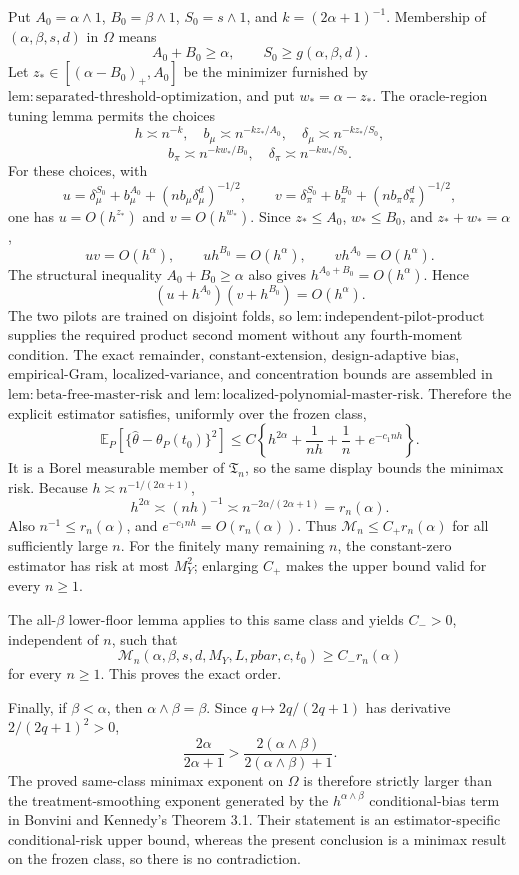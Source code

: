 Put \(A_0=\alpha\wedge1\), \(B_0=\beta\wedge1\), \(S_0=s\wedge1\), and \(k=(2\alpha+1)^{-1}\). Membership of \((\alpha,\beta,s,d)\) in \(\Omega\) means
\[
A_0+B_0\ge\alpha,
\qquad
S_0\ge g(\alpha,\beta,d).
\]
Let \(z_*\in[(\alpha-B_0)_+,A_0]\) be the minimizer furnished by \(\mathrm{lem:separated\text{-}threshold\text{-}optimization}\), and put \(w_*=\alpha-z_*\). The oracle-region tuning lemma permits the choices
\[
h\asymp n^{-k},\quad b_\mu\asymp n^{-kz_*/A_0},\quad \delta_\mu\asymp n^{-kz_*/S_0},
\]
\[
b_\pi\asymp n^{-kw_*/B_0},\quad \delta_\pi\asymp n^{-kw_*/S_0}.
\]
For these choices, with
\[
u=\delta_\mu^{S_0}+b_\mu^{A_0}+(nb_\mu\delta_\mu^d)^{-1/2},
\qquad
v=\delta_\pi^{S_0}+b_\pi^{B_0}+(nb_\pi\delta_\pi^d)^{-1/2},
\]
one has \(u=O(h^{z_*})\) and \(v=O(h^{w_*})\). Since \(z_*\le A_0\), \(w_*\le B_0\), and \(z_*+w_*=\alpha\),
\[
uv=O(h^\alpha),\qquad uh^{B_0}=O(h^\alpha),\qquad vh^{A_0}=O(h^\alpha).
\]
The structural inequality \(A_0+B_0\ge\alpha\) also gives \(h^{A_0+B_0}=O(h^\alpha)\). Hence
\[
(u+h^{A_0})(v+h^{B_0})=O(h^\alpha).
\]
The two pilots are trained on disjoint folds, so \(\mathrm{lem:independent\text{-}pilot\text{-}product}\) supplies the required product second moment without any fourth-moment condition. The exact remainder, constant-extension, design-adaptive bias, empirical-Gram, localized-variance, and concentration bounds are assembled in \(\mathrm{lem:beta\text{-}free\text{-}master\text{-}risk}\) and \(\mathrm{lem:localized\text{-}polynomial\text{-}master\text{-}risk}\). Therefore the explicit estimator satisfies, uniformly over the frozen class,
\[
\mathbb E_P\!\left[\{\widehat\theta-\theta_P(t_0)\}^2\right]
\le C\left\{h^{2\alpha}+\frac1{nh}+\frac1n+e^{-c_1nh}\right\}.
\]
It is a Borel measurable member of \(\mathfrak T_n\), so the same display bounds the minimax risk. Because \(h\asymp n^{-1/(2\alpha+1)}\),
\[
h^{2\alpha}\asymp(nh)^{-1}\asymp n^{-2\alpha/(2\alpha+1)}=r_n(\alpha).
\]
Also \(n^{-1}\le r_n(\alpha)\), and \(e^{-c_1nh}=O(r_n(\alpha))\). Thus \(\mathcal M_n\le C_+r_n(\alpha)\) for all sufficiently large \(n\). For the finitely many remaining \(n\), the constant-zero estimator has risk at most \(M_Y^2\); enlarging \(C_+\) makes the upper bound valid for every \(n\ge1\).

The all-\(\beta\) lower-floor lemma applies to this same class and yields \(C_->0\), independent of \(n\), such that
\[
\mathcal M_n(\alpha,\beta,s,d,M_Y,L,pbar,c,t_0)\ge C_-r_n(\alpha)
\]
for every \(n\ge1\). This proves the exact order.

Finally, if \(\beta<\alpha\), then \(\alpha\wedge\beta=\beta\). Since \(q\mapsto2q/(2q+1)\) has derivative \(2/(2q+1)^2>0\),
\[
\frac{2\alpha}{2\alpha+1}>
\frac{2(\alpha\wedge\beta)}{2(\alpha\wedge\beta)+1}.
\]
The proved same-class minimax exponent on \(\Omega\) is therefore strictly larger than the treatment-smoothing exponent generated by the \(h^{\alpha\wedge\beta}\) conditional-bias term in Bonvini and Kennedy's Theorem 3.1. Their statement is an estimator-specific conditional-risk upper bound, whereas the present conclusion is a minimax result on the frozen class, so there is no contradiction.